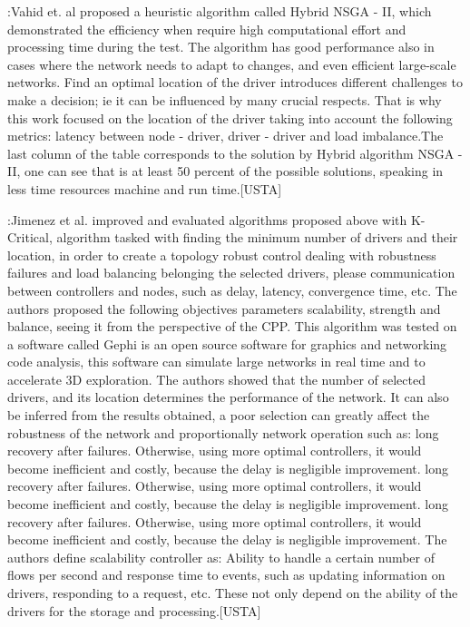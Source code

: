 \documentclass[a4paper,10pt]{article}
\begin{document}
\cite{AhJa15}:Vahid et. al proposed a heuristic algorithm called Hybrid NSGA - II, which demonstrated the efficiency when require high computational effort and processing time during the test. The algorithm has good performance also in cases where the network needs to adapt to changes, and even efficient large-scale networks. Find an optimal location of the driver introduces different challenges to make a decision; ie it can be influenced by many crucial respects. That is why this work focused on the location of the driver taking into account the following metrics: latency between node - driver, driver - driver and load imbalance.The last column of the table corresponds to the solution by Hybrid algorithm NSGA - II, one can see that is at least 50 percent of the possible solutions, speaking in less time resources machine and run time.[USTA]


\cite{JiCe14}:Jimenez et al. improved and evaluated algorithms proposed above with K-Critical, algorithm tasked with finding the minimum number of drivers and their location, in order to create a topology robust control dealing with robustness failures and load balancing belonging the selected drivers, please communication between controllers and nodes, such as delay, latency, convergence time, etc. The authors proposed the following objectives parameters scalability, strength and balance, seeing it from the perspective of the CPP. This algorithm was tested on a software called Gephi is an open source software for graphics and networking code analysis, this software can simulate large networks in real time and to accelerate 3D exploration. The authors showed that the number of selected drivers, and its location determines the performance of the network. It can also be inferred from the results obtained, a poor selection can greatly affect the robustness of the network and proportionally network operation such as: long recovery after failures. Otherwise, using more optimal controllers, it would become inefficient and costly, because the delay is negligible improvement. long recovery after failures. Otherwise, using more optimal controllers, it would become inefficient and costly, because the delay is negligible improvement. long recovery after failures. Otherwise, using more optimal controllers, it would become inefficient and costly, because the delay is negligible improvement.
The authors define scalability controller as: Ability to handle a certain number of flows per second and response time to events, such as updating information on drivers, responding to a request, etc. These not only depend on the ability of the drivers for the storage and processing.[USTA]
\end{document}
